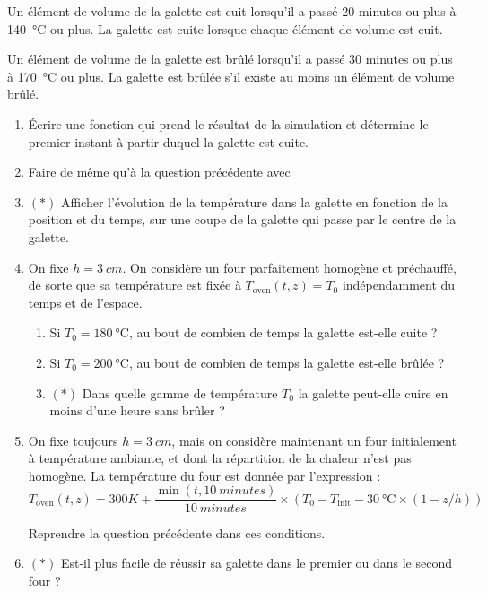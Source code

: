 \documentclass{article}
\newcommand{\paren}[1]{\ensuremath{\left(#1\right)}}
\begin{document}
Un élément de volume de la galette est cuit lorsqu'il a passé 20 minutes ou plus à \qty{140}{\degreeCelsius} ou plus. La galette est cuite lorsque chaque élément de volume est cuit.

Un élément de volume de la galette est brûlé lorsqu'il a passé 30 minutes ou plus à \qty{170}{\degreeCelsius} ou plus. La galette est brûlée s'il existe au moins un élément de volume brûlé.

\begin{enumerate}[resume]
	\item Écrire une fonction  qui prend le résultat de la simulation et détermine le premier instant à partir duquel la galette est cuite.
	
	\item Faire de même qu'à la question précédente avec 

	\item $(*)$ Afficher l'évolution de la température dans la galette en fonction de la position et du temps, sur une coupe de la galette qui passe par le centre de la galette.

	\item On fixe $h = \qty{3}{cm}$. On considère un four parfaitement homogène et préchauffé, de sorte que sa température est fixée à $T_{\text{oven}}(t, z) = T_0$ indépendamment du temps et de l'espace.
	\begin{enumerate}
		\item Si $T_0 = \qty{180}{\degreeCelsius}$, au bout de combien de temps la galette est-elle cuite ?
		\item Si $T_0 = \qty{200}{\degreeCelsius}$, au bout de combien de temps la galette est-elle brûlée ?
		\item $(*)$ Dans quelle gamme de température $T_0$ la galette peut-elle cuire en moins d'une heure sans brûler ?
	\end{enumerate}

	\item On fixe toujours $h = \qty{3}{cm}$, mais on considère maintenant un four initialement à température ambiante, et dont la répartition de la chaleur n'est pas homogène. La température du four est donnée par l'expression :
	\[T_{\text{oven}}(t, z) = \qty{300}K + \frac{\min(t, \qty{10}{minutes})}{\qty{10}{minutes}}\times\paren{T_0 - T_{\text{init}} - \qty{30}{\degreeCelsius}\times(1 - z/h)}\]
	
	Reprendre la question précédente dans ces conditions.
	
	\item $(*)$ Est-il plus facile de réussir sa galette dans le premier ou dans le second four ?
	

\end{enumerate}
\end{document}
